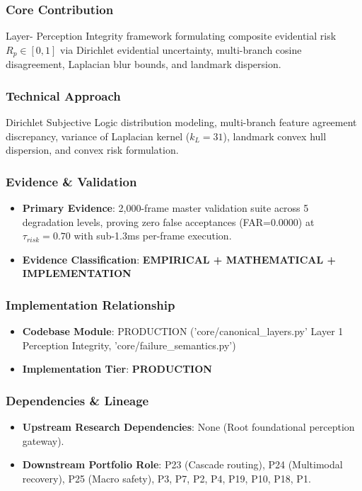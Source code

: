 \documentclass[11pt,letterpaper]{article}
\begin{document}
\subsubsection{Core Contribution}
Layer- Perception Integrity framework formulating composite evidential risk $R_p \in [0,1]$ via Dirichlet evidential uncertainty, multi-\allowbreak branch cosine disagreement, Laplacian blur bounds, and landmark dispersion.

\subsubsection{Technical Approach}
Dirichlet Subjective Logic distribution modeling, multi-\allowbreak branch feature agreement discrepancy, variance of Laplacian kernel ($k_L=31$), landmark convex hull dispersion, and convex risk formulation.

\subsubsection{Evidence \& Validation}
\begin{itemize}[leftmargin=*]
    \item \textbf{Primary Evidence}: 2,000-\allowbreak frame master validation suite across 5 degradation levels, proving zero false acceptances (FAR=0.0000) at $\tau_{risk}=0.70$ with sub-\allowbreak 1.3ms per-\allowbreak frame execution.
    \item \textbf{Evidence Classification}: \textbf{EMPIRICAL + MATHEMATICAL + IMPLEMENTATION}
\end{itemize}

\subsubsection{Implementation Relationship}
\begin{itemize}[leftmargin=*]
    \item \raggedright \textbf{Codebase Module}: PRODUCTION ('core/\allowbreak canonical\_\allowbreak layers.py' Layer 1 Perception Integrity, 'core/\allowbreak failure\_\allowbreak semantics.py')
    \item \textbf{Implementation Tier}: \textbf{PRODUCTION}
\end{itemize}

\subsubsection{Dependencies \& Lineage}
\begin{itemize}[leftmargin=*]
    \item \textbf{Upstream Research Dependencies}: None (Root foundational perception gateway).
    \item \textbf{Downstream Portfolio Role}: P23 (Cascade routing), P24 (Multimodal recovery), P25 (Macro safety), P3, P7, P2, P4, P19, P10, P18, P1.
\end{itemize}
\end{document}
